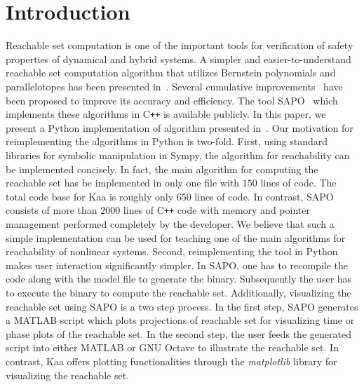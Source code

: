 \documentclass[EPiC]{easychair}
\begin{document}
%
%
%
\section{Introduction}

Reachable set computation is one of the 
important tools %
for verification of safety properties of dynamical and hybrid systems.
%
A simpler and easier-to-understand reachable set computation algorithm that utilizes Bernstein polynomials and parallelotopes has been presented in~\cite{dang2009image}.
%
Several cumulative improvements~\cite{dang2012reachability,sassi2012reachability,dang2014parameter,dreossi2016parallelotope,dreossi2017reachability} have been proposed to improve its accuracy and efficiency.
%
The tool SAPO~\cite{dreossi2017sapo} which implements these algorithms in C\texttt{++} is available publicly.
%
In this paper, we present a Python implementation of algorithm presented in~\cite{dreossi2017reachability}.
%
Our motivation for reimplementing the algorithms in Python is two-fold.
%
First, using standard libraries for symbolic manipulation in Sympy, the algorithm for reachability can be implemented concisely.
%
In fact, the main algorithm for computing the reachable set has be implemented in only one file with $150$ lines of code.
%
The total code base for Kaa is roughly only $650$ lines of code.
%
%
In contrast, SAPO consists of more than $2000$ lines of C\texttt{++} code with memory and pointer management performed completely by the developer.
%
We believe that such a simple implementation can be used for teaching one of the main algorithms for reachability of nonlinear systems.
%
Second, reimplementing the tool in Python makes user interaction significantly simpler. 
%
In SAPO, one has to recompile the code along with the model file to generate the binary. Subsequently the user has to execute the binary to compute the reachable set.
%
Additionally, visualizing the reachable set using SAPO is a two step process. In the first step, SAPO generates a MATLAB script which plots projections of reachable set for visualizing time or phase plots of the reachable set. In the second step, the user feeds the generated script into either MATLAB or GNU Octave to illustrate the reachable set. 
%
In contrast, Kaa offers plotting functionalities through the \emph{matplotlib} library for visualizing the reachable set.
\end{document}
